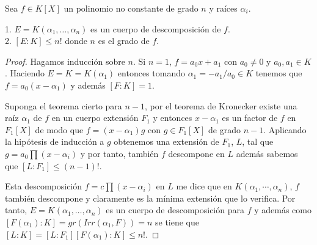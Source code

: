 \begin{proposition}
	Sea $f \in K[X]$ un polinomio no constante de grado $n$ y raíces $\alpha_i$. 
	
	1. $E = K(\alpha_1,\ldots,\alpha_n)$ es un cuerpo de descomposición de $f$. \\
	2. $[E:K] \le n!$ donde $n$ es el grado de $f$.
\end{proposition}
\begin{proof}
	Hagamos inducción sobre $n$. Si $n =  1$, $f = a_0x+a_1$ con $a_0 \neq 0$ y $a_0,a_1 \in K$. Haciendo $E = K = K(\alpha_1)$ entonces tomando $\alpha_1 = -a_1/a_0 \in K$ tenemos que $f = a_0(x-\alpha_1)$ y además $[F:K] = 1$. 
	
	Suponga el teorema cierto para $n-1$, por el teorema de Kronecker existe una raíz $\alpha_1$ de $f$ en un cuerpo extensión $F_1$ y entonces $x-\alpha_1$ es un factor de $f$ en $F_1[X]$ de modo que $f = (x-\alpha_1)g$ con $g \in F_1[X]$ de grado $n-1$. Aplicando la hipótesis de inducción a $g$ obtenemos una extensión de $F_1$, $L$, tal que $g = a_0 \prod (x - \alpha_i)$ y por tanto, también $f$ descompone en $L$ además sabemos que $[L:F_1] \le (n-1)!$. 
	
	Esta descomposición $f = c \prod (x - \alpha_i)$ en $L$ me dice que en $K(\alpha_1,\cdots,\alpha_n)$, $f$ también descompone y claramente es la mínima extensión que lo verifica. Por tanto, $E=K(\alpha_1,\ldots,\alpha_n)$ es un cuerpo de descomposición para $f$ y además como $[F(\alpha_1):K] = gr(Irr(\alpha_1,F)) = n$ se tiene que $[L:K] = [L:F_1][F(\alpha_1):K] \le n!$. 
\end{proof}

